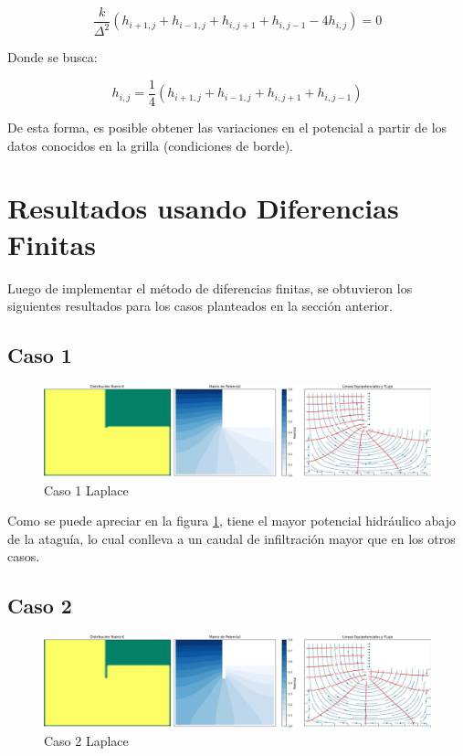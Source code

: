 \begin{equation}
    \frac{k}{\Delta^2}(h_{i+1,j} + h_{i-1,j} + h_{i,j+1} + h_{i,j-1} - 4h_{i,j}) = 0
\end{equation}

Donde se busca:

\begin{equation}
    h_{i,j} = \frac{1}{4}(h_{i+1,j} + h_{i-1,j} + h_{i,j+1} + h_{i,j-1})
\end{equation}

De esta forma, es posible obtener las variaciones en el potencial a partir de los datos conocidos en la grilla (condiciones de borde). \textbf{\cite{budhu_soil_2010}}

\newpage

\section{Resultados usando Diferencias Finitas}
Luego de implementar el método de diferencias finitas, se obtuvieron los siguientes resultados para los casos planteados en la sección anterior.
\subsection{Caso 1}

\begin{figure}[H]
    \centering
    \includegraphics[width=\textwidth]{GRAFICOS/laplace_caso_1.jpg}
    \caption{Caso 1 Laplace}
    \label{fig:laplace_caso_1}
\end{figure}

Como se puede apreciar en la figura \ref{fig:laplace_caso_1}, tiene el mayor potencial hidráulico abajo de la ataguía, lo cual conlleva a un caudal de infiltración mayor que en los otros casos.

\subsection{Caso 2}

\begin{figure}[H]
    \centering
    \includegraphics[width=\textwidth]{GRAFICOS/laplace_caso_2.jpg}
    \caption{Caso 2 Laplace}
    \label{fig:laplace_caso_2}
\end{figure}

